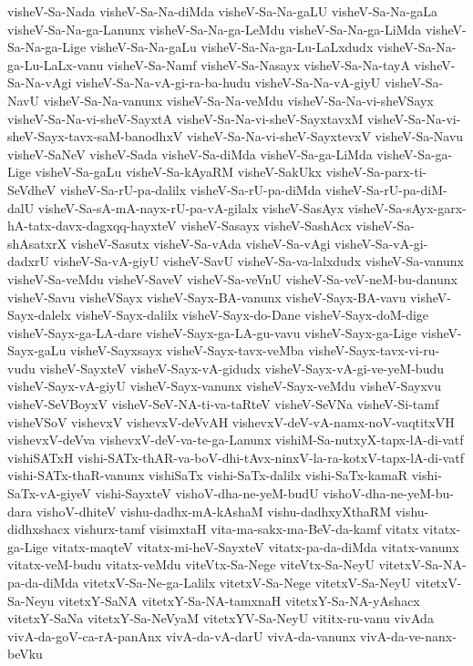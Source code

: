 {visheV-Sa-Nada
visheV-Sa-Na-diMda
visheV-Sa-Na-gaLU
visheV-Sa-Na-gaLa
visheV-Sa-Na-ga-Lanunx
visheV-Sa-Na-ga-LeMdu
visheV-Sa-Na-ga-LiMda
visheV-Sa-Na-ga-Lige
visheV-Sa-Na-gaLu
visheV-Sa-Na-ga-Lu-LaLxdudx
visheV-Sa-Na-ga-Lu-LaLx-vanu
visheV-Sa-Namf
visheV-Sa-Nasayx
visheV-Sa-Na-tayA
visheV-Sa-Na-vAgi
visheV-Sa-Na-vA-gi-ra-ba-hudu
visheV-Sa-Na-vA-giyU
visheV-Sa-NavU
visheV-Sa-Na-vanunx
visheV-Sa-Na-veMdu
visheV-Sa-Na-vi-sheVSayx
visheV-Sa-Na-vi-sheV-SayxtA
visheV-Sa-Na-vi-sheV-SayxtavxM
visheV-Sa-Na-vi-sheV-Sayx-tavx-saM-banodhxV
visheV-Sa-Na-vi-sheV-SayxtevxV
visheV-Sa-Navu
visheV-SaNeV
visheV-Sada
visheV-Sa-diMda
visheV-Sa-ga-LiMda
visheV-Sa-ga-Lige
visheV-Sa-gaLu
visheV-Sa-kAyaRM
visheV-SakUkx
visheV-Sa-parx-ti-SeVdheV
visheV-Sa-rU-pa-dalilx
visheV-Sa-rU-pa-diMda
visheV-Sa-rU-pa-diM-dalU
visheV-Sa-sA-mA-nayx-rU-pa-vA-gilalx
visheV-SasAyx
visheV-Sa-sAyx-garx-hA-tatx-davx-dagxqq-hayxteV
visheV-Sasayx
visheV-SashAcx
visheV-Sa-shAsatxrX
visheV-Sasutx
visheV-Sa-vAda
visheV-Sa-vAgi
visheV-Sa-vA-gi-dadxrU
visheV-Sa-vA-giyU
visheV-SavU
visheV-Sa-va-lalxdudx
visheV-Sa-vanunx
visheV-Sa-veMdu
visheV-SaveV
visheV-Sa-veVnU
visheV-Sa-veV-neM-bu-danunx
visheV-Savu
visheVSayx
visheV-Sayx-BA-vanunx
visheV-Sayx-BA-vavu
visheV-Sayx-dalelx
visheV-Sayx-dalilx
visheV-Sayx-do-Dane
visheV-Sayx-doM-dige
visheV-Sayx-ga-LA-dare
visheV-Sayx-ga-LA-gu-vavu
visheV-Sayx-ga-Lige
visheV-Sayx-gaLu
visheV-Sayxsayx
visheV-Sayx-tavx-veMba
visheV-Sayx-tavx-vi-ru-vudu
visheV-SayxteV
visheV-Sayx-vA-gidudx
visheV-Sayx-vA-gi-ve-yeM-budu
visheV-Sayx-vA-giyU
visheV-Sayx-vanunx
visheV-Sayx-veMdu
visheV-Sayxvu
visheV-SeVBoyxV
visheV-SeV-NA-ti-va-taRteV
visheV-SeVNa
visheV-Si-tamf
visheVSoV
vishevxV
vishevxV-deVvAH
vishevxV-deV-vA-namx-noV-vaqtitxVH
vishevxV-deVva
vishevxV-deV-va-te-ga-Lanunx
vishiM-Sa-nutxyX-tapx-lA-di-vatf
vishiSATxH
vishi-SATx-thAR-va-boV-dhi-tAvx-ninxV-la-ra-kotxV-tapx-lA-di-vatf
vishi-SATx-thaR-vanunx
vishiSaTx
vishi-SaTx-dalilx
vishi-SaTx-kamaR
vishi-SaTx-vA-giyeV
vishi-SayxteV
vishoV-dha-ne-yeM-budU
vishoV-dha-ne-yeM-bu-dara
vishoV-dhiteV
vishu-dadhx-mA-kAshaM
vishu-dadhxyXthaRM
vishu-didhxshacx
vishurx-tamf
visimxtaH
vita-ma-sakx-ma-BeV-da-kamf
vitatx
vitatx-ga-Lige
vitatx-maqteV
vitatx-mi-heV-SayxteV
vitatx-pa-da-diMda
vitatx-vanunx
vitatx-veM-budu
vitatx-veMdu
viteVtx-Sa-Nege
viteVtx-Sa-NeyU
vitetxV-Sa-NA-pa-da-diMda
vitetxV-Sa-Ne-ga-Lalilx
vitetxV-Sa-Nege
vitetxV-Sa-NeyU
vitetxV-Sa-Neyu
vitetxY-SaNA
vitetxY-Sa-NA-tamxnaH
vitetxY-Sa-NA-yAshacx
vitetxY-SaNa
vitetxY-Sa-NeVyaM
vitetxYV-Sa-NeyU
vititx-ru-vanu
vivAda
vivA-da-goV-ca-rA-panAnx
vivA-da-vA-darU
vivA-da-vanunx
vivA-da-ve-nanx-beVku
}
